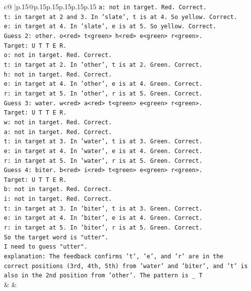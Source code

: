 \documentclass{article}
\begin{document}
{\begin{supertabular}{c@{$\;$}|p{.15\linewidth}@{}p{.15\linewidth}p{.15\linewidth}p{.15\linewidth}p{.15\linewidth}p{.15\linewidth}}
{{{\texttt{a: not in target. Red. Correct.} \\
\texttt{t: in target at 2 and 3. In 'slate', t is at 4. So yellow. Correct.} \\
\texttt{e: in target at 4. In 'slate', e is at 5. So yellow. Correct.} \\
\texttt{Guess 2: other. o<red> t<green> h<red> e<green> r<green>.} \\
\texttt{Target: U T T E R.} \\
\texttt{o: not in target. Red. Correct.} \\
\texttt{t: in target at 2. In 'other', t is at 2. Green. Correct.} \\
\texttt{h: not in target. Red. Correct.} \\
\texttt{e: in target at 4. In 'other', e is at 4. Green. Correct.} \\
\texttt{r: in target at 5. In 'other', r is at 5. Green. Correct.} \\
\texttt{Guess 3: water. w<red> a<red> t<green> e<green> r<green>.} \\
\texttt{Target: U T T E R.} \\
\texttt{w: not in target. Red. Correct.} \\
\texttt{a: not in target. Red. Correct.} \\
\texttt{t: in target at 3. In 'water', t is at 3. Green. Correct.} \\
\texttt{e: in target at 4. In 'water', e is at 4. Green. Correct.} \\
\texttt{r: in target at 5. In 'water', r is at 5. Green. Correct.} \\
\texttt{Guess 4: biter. b<red> i<red> t<green> e<green> r<green>.} \\
\texttt{Target: U T T E R.} \\
\texttt{b: not in target. Red. Correct.} \\
\texttt{i: not in target. Red. Correct.} \\
\texttt{t: in target at 3. In 'biter', t is at 3. Green. Correct.} \\
\texttt{e: in target at 4. In 'biter', e is at 4. Green. Correct.} \\
\texttt{r: in target at 5. In 'biter', r is at 5. Green. Correct.} \\
\texttt{So the target word is "utter".} \\
\texttt{I need to guess "utter".} \\
\texttt{explanation: The feedback confirms 't', 'e', and 'r' are in the correct positions (3rd, 4th, 5th) from 'water' and 'biter', and 't' is also in the 2nd position from 'other'. The pattern is \_ T} \\
            }
        }
    }
    & & \\ \\


\end{supertabular}}
\end{document}
